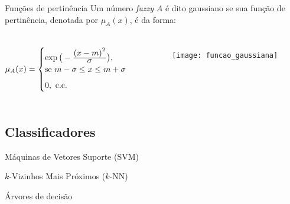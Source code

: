 \begin{frame}{Funções de pertinência}
Um número \emph{fuzzy} $A$ é dito gaussiano se sua função de pertinência, denotada por $\mu_{A}(x)$, é da forma:

\begin{columns}
\begin{equation*}
  \mu_A(x) =  \begin{cases}
                \exp{\big(-\ensuremath{\frac{\displaystyle {(x - m)}^2}{\displaystyle \sigma}} \big)}, \\ \text{se}\ m - \sigma \leq x \leq m + \sigma\\[0.5em]
                0, \ \text{c.c.}
              \end{cases}
\end{equation*}

\begin{figure}[!h]
  \centering
  \texttt{[image: funcao\_gaussiana]}
\end{figure}
\end{columns}
\end{frame}

\subsection{Classificadores}
\begin{frame}{Máquinas de Vetores Suporte (SVM)}
\end{frame}

\begin{frame}{$k$-Vizinhos Mais Próximos ($k$-NN)}
\end{frame}

\begin{frame}{Árvores de decisão}
\end{frame}